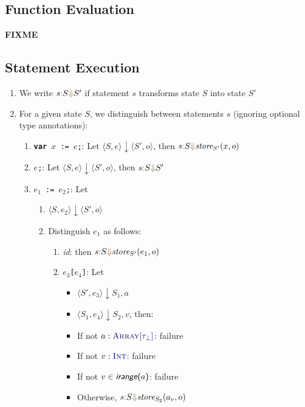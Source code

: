 \documentclass{article}
\newcommand{\tuple}[1]{\ensuremath{\langle #1 \rangle}}
\newcommand{\vterminal}[1]{\textsf{\textcolor{dgreen}{\texttt{#1}}}}
\newcommand{\Ty}[1]{\textcolor{dblue}{#1}}
\newcommand{\Ckw}[1]{{\textsf{\textbf{#1}}}}
\newcommand{\TInt}{\Ty{\textsc{Int}}}
\newcommand{\TArrayof}[1]{\Ty{\textsc{Array}[#1]}}
\newcommand{\arrayindices}[1]{\textsf{\textit{irange}(#1)}}
\newcommand{\failure}{\textcolor{dred}{failure}}
\newcommand{\SEVAL}[3]{#1\textcolor{dorange}{:} #2\textcolor{dorange}{\Downarrow}#3}
\begin{document}
\subsection{Function Evaluation}
\textbf{FIXME}

\subsection{Statement Execution}
\begin{enumerate}
\item We write $\SEVAL{s}{S}{S'}$ if statement $s$ transforms state $S$ into state $S'$
\item For a given state $S$, we distinguish between statements $s$ (ignoring optional type annotations):
  \begin{enumerate}
    \item \vterminal{\Ckw{var} $x$ := $e$;}: Let $\tuple{S, e} \downarrow \tuple{S', o}$, then $\SEVAL{s}{S}{\textit{store}_{S'}(x, o)}$
    \item \vterminal{$e$;}: Let $\tuple{S, e} \downarrow \tuple{S', o}$, then $\SEVAL{s}{S}{S'}$
    \item \vterminal{$e_1$ := $e_2$;}: Let
      \begin{enumerate}
      \item $\tuple{S, e_2} \downarrow \tuple{S', o}$
      \item Distinguish $e_1$ as follows:
        \begin{enumerate}
          \item \textit{id}: then $\SEVAL{s}{S}{\textit{store}_{S'}(e_1, o)}$
          \item \vterminal{$e_3$[$e_4$]}: Let
            \begin{itemize}
            \item $\tuple{S', e_3} \downarrow {S_1, a}$
            \item $\tuple{S_1, e_4} \downarrow {S_2, v}$, then:
            \item If not $a : \TArrayof{\tau_\bot}$: \failure
            \item If not $v : \TInt$: \failure
            \item If not $v \in \arrayindices{$a$}$: \failure
            \item Otherwise, $\SEVAL{s}{S}{\textit{store}_{S_2}(a_v, o)}$
            \end{itemize}
        \end{enumerate}
      \end{enumerate}

\end{enumerate}
\end{enumerate}
\end{document}
